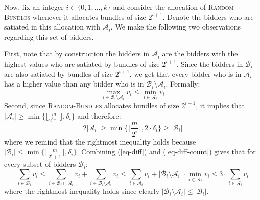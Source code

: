 Now, fix an integer $i\in \{0,1,\ldots,k\}$ and
consider the allocation of \textsc{Random-Bundles} whenever it allocates bundles of size $2^{i+1}$. Denote the bidders who are satiated in this allocation with $\mathcal A_i$. We make the following two observations regarding this set of bidders.

First, note that by construction the bidders in $\mathcal A_i$ are the bidders with the highest values who are  satiated by bundles of size  $2^{i+1}$. Since the bidders in $\mathcal B_i$ are also satiated by bundles of size $2^{i+1}$, we get that every bidder who is in $\mathcal A_i$ has a higher value than any bidder who is in $\mathcal B_i\setminus \mathcal A_i$. Formally: 
\begin{equation}\label{eq-diff}
  \max_{i\in \mathcal B_i \setminus \mathcal A_i} v_i \le \min_{i\in \mathcal A_i} v_i  
\end{equation}
Second, since \textsc{Random-Bundles} allocates bundles of size $2^{i+1}$, it implies that $|\mathcal A_i|\ge \min\{\lfloor \frac{m}{2^{i+1}}\rfloor,\delta_i\}$ and therefore: 
\begin{equation}\label{eq-diff-count}
2|\mathcal A_i|\ge \min \{\Big\lfloor \frac{m}{2^{i}}\Big\rfloor,2\cdot \delta_i\} \ge |\mathcal B_i|
\end{equation}
where we remind that the rightmost inequality holds because $|\mathcal B_i|\le \min\{\Big\lfloor \frac{m}{2^{i}+1}\Big\rfloor ,\delta_i\}$.
Combining (\ref{eq-diff}) and (\ref{eq-diff-count}) gives that for every subset of bidders $\mathcal B_i$:
\begin{equation}\label{eq-comp}
    \sum_{i\in \mathcal B_i} v_i \le    \sum_{i\in \mathcal B_i\cap \mathcal A_i} v_i  + 
        \sum_{i\in \mathcal B_i\setminus \mathcal A_i} v_i \le \sum_{i\in \mathcal A_i} v_i + |\mathcal B_i \setminus \mathcal A_i|\cdot \min_{i\in \mathcal A_i} v_i \le 3\cdot \sum_{i\in \mathcal A_i} v_i
\end{equation}
where the rightmost inequality holds since clearly $|\mathcal B_i\setminus \mathcal A_i| \le |\mathcal B_i|$. 


